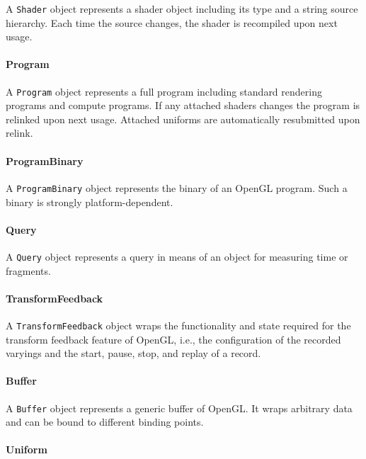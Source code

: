\documentclass{article}
\begin{document}
A \lstinline|Shader| object represents a shader object including its type and a string source hierarchy.
Each time the source changes, the shader is recompiled upon next usage.

\paragraph{Program}

A \lstinline|Program| object represents a full program including standard rendering programs and compute programs.
If any attached shaders changes the program is relinked upon next usage. Attached uniforms are automatically resubmitted upon relink.

\paragraph{ProgramBinary}

A \lstinline|ProgramBinary| object represents the binary of an OpenGL program. Such a binary is strongly platform-dependent.

\paragraph{Query}

A \lstinline|Query| object represents a query in means of an object for measuring time or fragments.

\paragraph{TransformFeedback}

A \lstinline|TransformFeedback| object wraps the functionality and state required for the transform feedback feature of OpenGL, i.e., the configuration of the recorded varyings and the start, pause, stop, and replay of a record.

\paragraph{Buffer}

A \lstinline|Buffer| object represents a generic buffer of OpenGL. It wraps arbitrary data and can be bound to different binding points.

\paragraph{Uniform}
\end{document}
